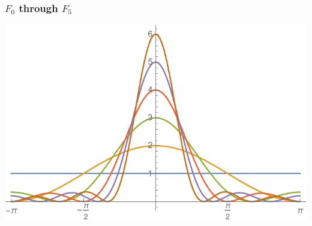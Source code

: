 \documentclass[xcolor=dvipsnames]{beamer}
\theoremstyle{definition}
\begin{document}
\begin{frame}
  \frametitle{$F_0$ through $F_5$}
  
  \includegraphics[scale=0.75]{plot}

\end{frame}
\end{document}
